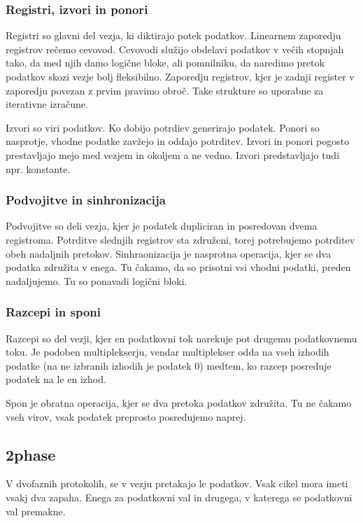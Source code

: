 \subsubsection{Registri, izvori in ponori} \label{c}
Registri so glavni del vezja, ki diktirajo potek podatkov. 
Linearnem zaporedju registrov rečemo cevovod. Cevovodi služijo obdelavi podatkov v večih stopnjah tako, da med njih damo logične bloke, ali pomnilniku, da naredimo pretok podatkov skozi vezje bolj fleksibilno.
Zaporedju registrov, kjer je zadnji register v zaporedju povezan z prvim pravimo obroč. Take strukture so uporabne za iterativne izračune.

Izvori so viri podatkov. Ko dobijo potrdiev generirajo podatek. Ponori so nasprotje, vhodne podatke zavžejo in oddajo potrditev. Izvori in ponori pogosto prestavljajo mejo med vezjem in okoljem a ne vedno. Izvori predstavljajo tudi npr. konstante.

\subsubsection{Podvojitve in sinhronizacija} \label{c}
Podvojitve so deli vezja, kjer je podatek dupliciran in posredovan dvema registroma. Potrditve slednjih registrov sta združeni, torej potrebujemo potrditev obeh nadaljnih pretokov.
Sinhraonizacija je nasprotna operacija, kjer se dva podatka združita v enega. Tu čakamo, da so prisotni vsi vhodni podatki, preden nadaljujemo. Tu so ponavadi logični bloki.


\subsubsection{Razcepi in sponi} \label{c}
Razcepi so del vezji, kjer en podatkovni tok narekuje pot drugemu podatkovnemu toku. Je podoben multiplekserju, vendar multiplekser odda na vseh izhodih podatke (na ne izbranih izhodih je podatek 0) medtem, ko razcep posreduje podatek na le en izhod.

Spon je obratna operacija, kjer se dva pretoka podatkov združita. Tu ne čakamo vseh virov, vsak podatek preprosto posredujemo naprej.


\subsection{2phase} \label{b}
V dvofaznih protokolih, se v vezju pretakajo le podatkov. Vsak cikel mora imeti vsakj dva zapaha. Enega za podatkovni val in drugega, v katerega se podatkovni val premakne.

